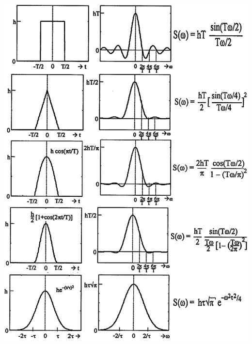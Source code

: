 \begin{landscape}

\begin{minipage}{7cm}
\includegraphics[width=\textwidth,trim= 0cm 0cm 0cm 0cm]{bilder/Transformationen/Fourier-Trafo.png}
\end{minipage}
\begin{minipage}{8.25cm}

\end{minipage}
\end{landscape}
